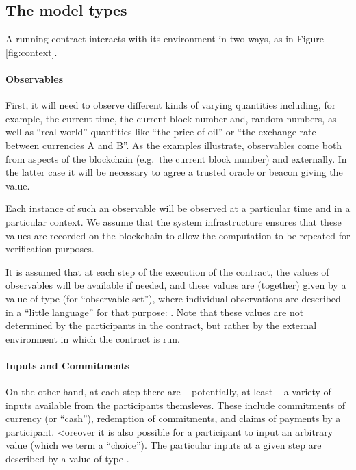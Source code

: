 \documentclass[runningheads]{llncs}
\begin{document}
\subsection{The model types}

A running contract interacts with its environment in two ways, as in Figure \ref{fig:context}.

\paragraph{Observables}


First, it will need to observe different kinds of varying quantities including, for example, the current time, the 
current block number and, random numbers, as well as ``real world'' quantities like ``the price of oil'' or ``the 
exchange rate between currencies A and B''. 
As the examples illustrate, observables come both from aspects of the blockchain (e.g.\ the current block number) and 
externally. In the latter case it will be necessary to agree a trusted oracle or beacon giving the value.


Each instance of such an observable will be observed at a particular time and in a particular context. We assume that the system infrastructure ensures that these values are recorded on the blockchain to 
allow the computation to be repeated for verification purposes. 


It is assumed that at each step of the execution of the 
contract, the values of observables will be available if needed, and these values are (together) given by a value of type 
 (for ``observable set''), where individual observations are described in a 
``little language'' for that purpose: . 
Note that these values are not determined by the participants in the contract, but rather by the 
external environment in which the contract is run.

 

\paragraph{Inputs and Commitments}


On the other hand, at each step there are -- potentially, at least -- a variety of inputs available from the 
participants themsleves. These include commitments of currency (or ``cash''), redemption of commitments, and claims of payments by 
a participant. <oreover it is also possible for a participant to input an arbitrary value (which we term a ``choice''). 
The particular inputs at a given step are described by a value of type .
\end{document}
